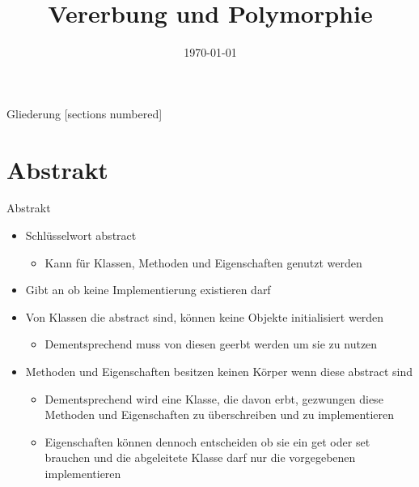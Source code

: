 



\title{Vererbung und Polymorphie}
\date{\today}




\maketitle

\begin{frame}{Gliederung}
	[sections numbered]
	\tableofcontents
\end{frame}

\section{Abstrakt}
\begin{frame}{Abstrakt}
	\begin{itemize}
		\item Schlüsselwort \alert{abstract}
		\begin{itemize}
			\item Kann für Klassen, Methoden und Eigenschaften genutzt werden		
		\end{itemize}
		\item Gibt an ob keine Implementierung existieren darf
		\item Von Klassen die \alert{abstract} sind, können keine Objekte initialisiert werden
		\begin{itemize}
			\item Dementsprechend muss von diesen geerbt werden um sie zu nutzen
		\end{itemize}
		\item Methoden und Eigenschaften besitzen keinen Körper wenn diese \alert{abstract} sind
		\begin{itemize}
			\item Dementsprechend wird eine Klasse, die davon erbt, gezwungen diese Methoden und Eigenschaften zu überschreiben und zu implementieren
			\item Eigenschaften können dennoch entscheiden ob sie ein \alert{get} oder \alert{set} brauchen und die abgeleitete Klasse darf nur die vorgegebenen implementieren
		\end{itemize}
	\end{itemize}
\end{frame}

